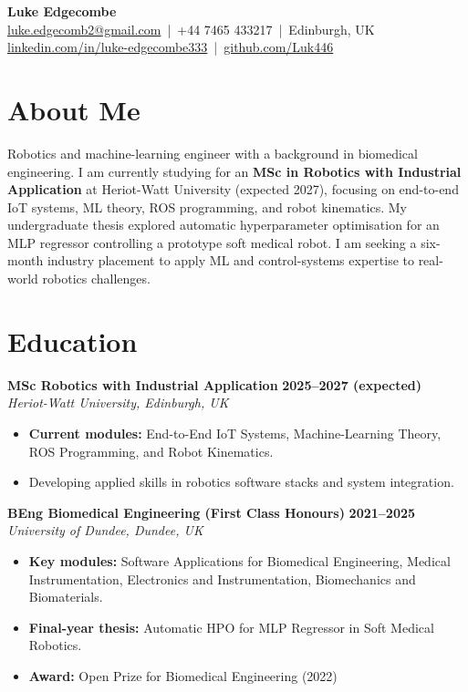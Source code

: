 \documentclass[a4paper,11pt]{article}
\begin{document}
\begin{center}
    {\LARGE \textbf{Luke Edgecombe}} \\[4pt]
    \href{mailto:luke.edgecomb2@gmail.com}{luke.edgecomb2@gmail.com} \,|\, +44 7465 433217 \,|\, Edinburgh, UK \\
    \href{https://linkedin.com/in/luke-edgecombe333}{linkedin.com/in/luke-edgecombe333} \,|\, 
    \href{https://github.com/Luk446}{github.com/Luk446}
\end{center}

\vspace{0.3cm}

\section*{About Me}
Robotics and machine-learning engineer with a background in biomedical engineering. I am currently studying for an \textbf{MSc in Robotics with Industrial Application} at Heriot-Watt University (expected 2027), focusing on end-to-end IoT systems, ML theory, ROS programming, and robot kinematics. My undergraduate thesis explored automatic hyperparameter optimisation for an MLP regressor controlling a prototype soft medical robot. I am seeking a six-month industry placement to apply ML and control-systems expertise to real-world robotics challenges.

\section*{Education}

\textbf{MSc Robotics with Industrial Application} \hfill \textbf{2025--2027 (expected)}\\
\textit{Heriot-Watt University, Edinburgh, UK}
\begin{itemize}
    \item \textbf{Current modules:} End-to-End IoT Systems, Machine-Learning Theory, ROS Programming, and Robot Kinematics.
    \item Developing applied skills in robotics software stacks and system integration.
\end{itemize}

\textbf{BEng Biomedical Engineering (First Class Honours)} \hfill \textbf{2021--2025}\\
\textit{University of Dundee, Dundee, UK}
\begin{itemize}
    \item \textbf{Key modules:} Software Applications for Biomedical Engineering, Medical Instrumentation, Electronics and Instrumentation, Biomechanics and Biomaterials.
    \item \textbf{Final-year thesis:} Automatic HPO for MLP Regressor in Soft Medical Robotics.
    \item \textbf{Award:} Open Prize for Biomedical Engineering (2022)
\end{itemize}
\end{document}
